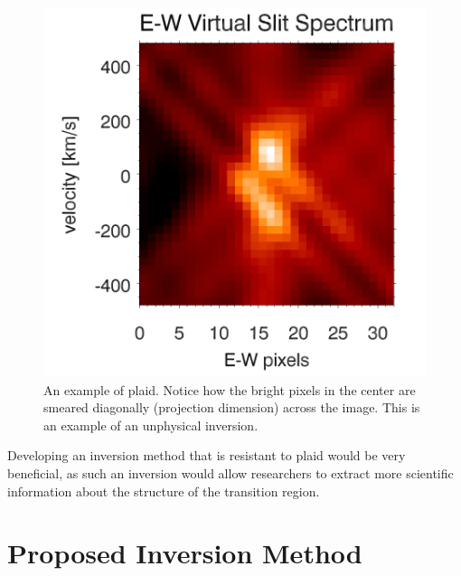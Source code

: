 \documentclass[twoside]{article}
\begin{document}
\begin{multicols}{2}
\begin{figure}[H]
	\includegraphics[width=\linewidth]{images/plaid2}
	\caption{An example of plaid. Notice how the bright pixels in the center are smeared diagonally (projection dimension) across the image. This is an example of an unphysical inversion. \cite{tom} }
\end{figure} 

Developing an inversion method that is resistant to plaid would be very beneficial, as such an inversion would allow researchers to extract more scientific information about the structure of the transition region.

\section{Proposed Inversion Method}

\end{multicols}
\end{document}
